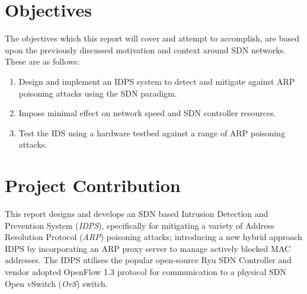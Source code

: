 \documentclass[12pt, oneside]{book}
\begin{document}

\section{Objectives}
\label{sec:objs}
The objectives which this report will cover and attempt to accomplish, are based upon the previously 
discussed motivation and context around SDN networks. These are as follows:
\begin{enumerate}
	\itemsep0em
	\item Design and implement an IDPS system to detect and mitigate against ARP poisoning attacks using the SDN paradigm.
  \item Impose minimal effect on network speed and SDN controller resources.
	\item Test the IDS using a hardware testbed against a range of ARP poisoning attacks.
\end{enumerate}

\newpage
\section{Project Contribution}
This report designs and develops an SDN based Intrusion Detection and Prevention System (\emph{IDPS}), specifically
for mitigating a variety of Address Resolution Protocol (\emph{ARP}) poisoning attacks; introducing a new hybrid approach
IDPS by incorporating an ARP proxy server to manage actively blocked MAC addresses.
The IDPS utilises the popular open-source Ryu SDN Controller and vendor adopted OpenFlow 1.3 protocol for communication to a 
physical SDN Open vSwitch (\emph{OvS}) switch.
\end{document}
